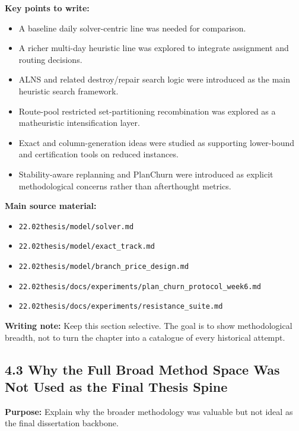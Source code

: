 \textbf{Key points to write:}
\begin{itemize}
    \item A baseline daily solver-centric line was needed for comparison.
    \item A richer multi-day heuristic line was explored to integrate assignment and routing decisions.
    \item ALNS and related destroy/repair search logic were introduced as the main heuristic search framework.
    \item Route-pool restricted set-partitioning recombination was explored as a matheuristic intensification layer.
    \item Exact and column-generation ideas were studied as supporting lower-bound and certification tools on reduced instances.
    \item Stability-aware replanning and PlanChurn were introduced as explicit methodological concerns rather than afterthought metrics.
\end{itemize}

\textbf{Main source material:}
\begin{itemize}
    \item \texttt{22.02thesis/model/solver.md}
    \item \texttt{22.02thesis/model/exact\_track.md}
    \item \texttt{22.02thesis/model/branch\_price\_design.md}
    \item \texttt{22.02thesis/docs/experiments/plan\_churn\_protocol\_week6.md}
    \item \texttt{22.02thesis/docs/experiments/resistance\_suite.md}
\end{itemize}

\textbf{Writing note:} Keep this section selective. The goal is to show methodological breadth, not to turn the chapter into a catalogue of every historical attempt.

\subsection*{4.3 Why the Full Broad Method Space Was Not Used as the Final Thesis Spine}
\textbf{Purpose:} Explain why the broader methodology was valuable but not ideal as the final dissertation backbone.

